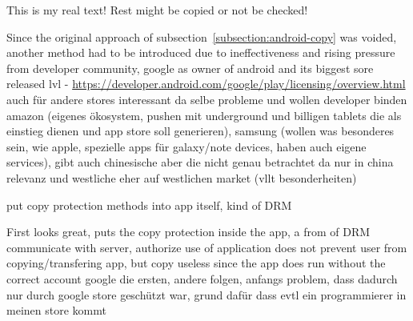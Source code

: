 This is my real text! Rest might be copied or not be checked!

Since the original approach of subsection~\ref{subsection:android-copy} was voided, another method had to be introduced due to ineffectiveness and rising pressure from developer community, google as owner of android and its biggest sore released lvl - \url{https://developer.android.com/google/play/licensing/overview.html}
auch für andere stores interessant da selbe probleme und wollen developer binden
amazon (eigenes ökosystem, pushen mit underground und billigen tablets die als einstieg dienen und app store soll generieren), samsung (wollen was besonderes sein, wie apple, spezielle apps für galaxy/note devices, haben auch eigene services), gibt auch chinesische aber die nicht genau betrachtet da nur in china relevanz und westliche eher auf westlichen market (vllt besonderheiten)
\cite{munteanLicense}


put copy protection methods into app itself, kind of DRM


First looks great, puts the copy protection inside the app, a from of DRM\newline
communicate with server, authorize use of application\newline
does not prevent user from copying/transfering app, but copy useless since the app does run without the correct account\newline
google die ersten, andere folgen, anfangs problem, dass dadurch nur durch google store geschützt war, grund dafür dass evtl ein programmierer in meinen store kommt\newline
